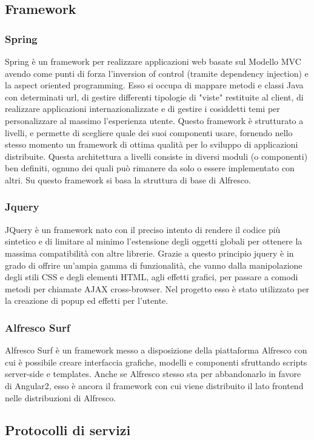 \subsection{Framework}
\subsubsection{Spring}
Spring è un framework per realizzare applicazioni web basate sul Modello MVC
avendo come punti di forza l’inversion of control (tramite dependency injection) e la
aspect oriented programming. Esso si occupa di mappare metodi e classi Java con
determinati url, di gestire differenti tipologie di "viste" restituite al client, di realizzare
applicazioni internazionalizzate e di gestire i cosiddetti temi per personalizzare al
massimo l’esperienza utente. Questo framework è strutturato a livelli, e permette di
scegliere quale dei suoi componenti usare, fornendo nello stesso momento un framework di ottima qualità per lo sviluppo di applicazioni distribuite. Questa architettura a livelli consiste
in diversi moduli (o componenti) ben definiti, ognuno dei quali può rimanere da solo o
essere implementato con altri.
Su questo framework si basa la struttura di base di Alfresco.
\subsubsection{Jquery}
JQuery è un framework nato con il preciso intento di rendere il codice più sintetico
e di limitare al minimo l’estensione degli oggetti globali per ottenere la massima
compatibilità con altre librerie. Grazie a questo principio jquery è in grado di offrire
un’ampia gamma di funzionalità, che vanno dalla manipolazione degli stili CSS e degli
elementi HTML, agli effetti grafici, per passare a comodi metodi per chiamate AJAX
cross-browser. Nel progetto esso è stato utilizzato per la creazione di popup ed effetti per l'utente.
\subsubsection{Alfresco Surf}
Alfresco Surf è un framework messo a disposizione della piattaforma Alfresco con cui è
possibile creare interfaccia grafiche, modelli e componenti sfruttando scripts server-side
e templates.
Anche se Alfresco stesso sta per abbandonarlo in favore di Angular2, esso è ancora il framework con cui viene distribuito il lato frontend nelle distribuzioni di Alfresco.
\subsection{Protocolli di servizi}
